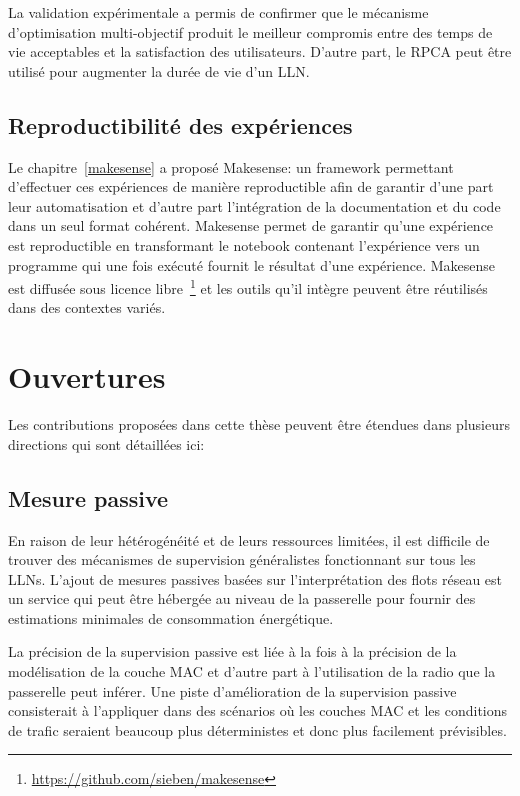 La validation expérimentale a permis de confirmer que le mécanisme d'optimisation multi-objectif produit le meilleur compromis entre des temps de vie acceptables et la satisfaction des utilisateurs. 
D'autre part, le \ac{RPCA} peut être utilisé pour augmenter la durée de vie d'un \ac{LLN}.

\subsection{Reproductibilité des expériences}

Le chapitre~\ref{makesense} a proposé Makesense: un framework permettant d'effectuer ces expériences de manière reproductible afin de garantir d'une part leur automatisation et d'autre part l'intégration de la documentation et du code dans un seul format cohérent.
Makesense permet de garantir qu'une expérience est reproductible en transformant le notebook contenant l'expérience vers un programme qui une fois exécuté fournit le résultat d'une expérience.
Makesense est diffusée sous licence libre~\footnote{\href{https://github.com/sieben/makesense}{https://github.com/sieben/makesense}} et les outils qu'il intègre peuvent être réutilisés dans des contextes variés.

\section{Ouvertures}

Les contributions proposées dans cette thèse peuvent être étendues dans plusieurs directions qui sont détaillées ici:

\subsection{Mesure passive}

En raison de leur hétérogénéité et de leurs ressources limitées, il est difficile de trouver des mécanismes de supervision généralistes fonctionnant sur tous les \ac{LLN}s.
L'ajout de mesures passives basées sur l'interprétation des flots réseau est un service qui peut être hébergée au niveau de la passerelle pour fournir des estimations minimales de consommation énergétique.

La précision de la supervision passive est liée à la fois à la précision de la modélisation de la couche MAC et d'autre part à l'utilisation de la radio que la passerelle peut inférer.
Une piste d'amélioration de la supervision passive consisterait à l'appliquer dans des scénarios où les couches \ac{MAC} et les conditions de trafic seraient beaucoup plus déterministes et donc plus facilement prévisibles.

